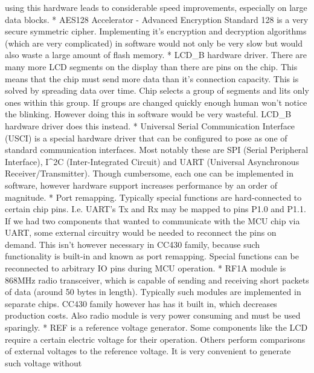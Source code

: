 \begin{commnet}
       using this hardware leads to considerable speed improvements,
       especially on large data blocks.
     * AES128 Accelerator - Advanced Encryption Standard 128 is a very
       secure symmetric cipher. Implementing it's encryption and
       decryption algorithms (which are very complicated) in software
       would not only be very slow but would also waste a large
       amount of flash memory.
     * LCD_B hardware driver. There are many more LCD segments on the
       display than there are pins on the chip. This means that the
       chip must send more data than it's connection capacity. This is
       solved by spreading data over time. Chip selects a group of
       segments and lits only ones within this group. If groups are
       changed quickly enough human won't notice the blinking. However
       doing this in software would be very wasteful. LCD_B hardware
       driver does this instead.
     * Universal Serial Communication Interface (USCI) is a special
       hardware driver that can be configured to pose as one of
       standard communication interfaces. Most notably these are SPI
       (Serial Peripheral Interface), I^2C (Inter-Integrated Circuit)
       and UART (Universal Asynchronous Receiver/Transmitter). Though
       cumbersome, each one can be implemented in software, however
       hardware support increases performance by an order of
       magnitude.
     * Port remapping. Typically special functions are hard-connected to
       certain chip pins. I.e. UART's Tx and Rx may be mapped to pins
       P1.0 and P1.1. If we had two components that wanted to
       communicate with the MCU chip via UART, some external circuitry
       would be needed to reconnect the pins on demand. This isn't
       however necessary in CC430 family, because such functionality is
       built-in and known as port remapping. Special functions can
       be reconnected to arbitrary IO pins during MCU operation.
     * RF1A module is 868MHz radio transceiver, which is capable of
     sending and receiving short packets of data (around 50 bytes in
     length). Typically such modules are implemented in separate
     chips. CC430 family however has has it built in, which decreases
     production costs. Also radio module is very power consuming and
     must be used sparingly.
     * REF is a reference voltage generator. Some components like the
     LCD require a certain electric voltage for their operation.
     Others perform comparisons of external voltages to the reference
     voltage. It is very convenient to generate such voltage without

\end{commnet}
